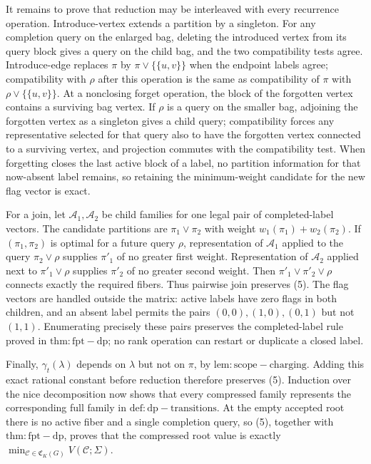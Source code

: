It remains to prove that reduction may be interleaved with every recurrence operation.  Introduce-vertex extends a partition by a singleton.  For any completion query on the enlarged bag, deleting the introduced vertex from its query block gives a query on the child bag, and the two compatibility tests agree.  Introduce-edge replaces \(\pi\) by \(\pi\vee\{\{u,v\}\}\) when the endpoint labels agree; compatibility with \(\rho\) after this operation is the same as compatibility of \(\pi\) with \(\rho\vee\{\{u,v\}\}\).  At a nonclosing forget operation, the block of the forgotten vertex contains a surviving bag vertex.  If \(\rho\) is a query on the smaller bag, adjoining the forgotten vertex as a singleton gives a child query; compatibility forces any representative selected for that query also to have the forgotten vertex connected to a surviving vertex, and projection commutes with the compatibility test.  When forgetting closes the last active block of a label, no partition information for that now-absent label remains, so retaining the minimum-weight candidate for the new flag vector is exact.

For a join, let \(\mathscr A_1,\mathscr A_2\) be child families for one legal pair of completed-label vectors.  The candidate partitions are \(\pi_1\vee\pi_2\) with weight \(w_1(\pi_1)+w_2(\pi_2)\).  If \((\pi_1,\pi_2)\) is optimal for a future query \(\rho\), representation of \(\mathscr A_1\) applied to the query \(\pi_2\vee\rho\) supplies \(\pi'_1\) of no greater first weight.  Representation of \(\mathscr A_2\) applied next to \(\pi'_1\vee\rho\) supplies \(\pi'_2\) of no greater second weight.  Then \(\pi'_1\vee\pi'_2\vee\rho\) connects exactly the required fibers.  Thus pairwise join preserves (5).  The flag vectors are handled outside the matrix: active labels have zero flags in both children, and an absent label permits the pairs \((0,0),(1,0),(0,1)\) but not \((1,1)\).  Enumerating precisely these pairs preserves the completed-label rule proved in \(\mathrm{thm:fpt-dp}\); no rank operation can restart or duplicate a closed label.

Finally, \(\gamma_t(\lambda)\) depends on \(\lambda\) but not on \(\pi\), by \(\mathrm{lem:scope-charging}\).  Adding this exact rational constant before reduction therefore preserves (5).  Induction over the nice decomposition now shows that every compressed family represents the corresponding full family in \(\mathrm{def:dp-transitions}\).  At the empty accepted root there is no active fiber and a single completion query, so (5), together with \(\mathrm{thm:fpt-dp}\), proves that the compressed root value is exactly \(\min_{\mathcal C\in\mathfrak C_K(G)}V(\mathcal C;\Sigma)\).

